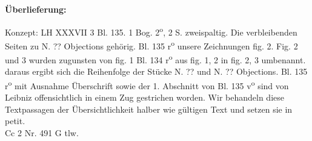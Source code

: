       
               
                \begin{ledgroupsized}[r]{120mm}
                \footnotesize 
                \pstart                
                \noindent\textbf{\"{U}berlieferung:}   
                \pend
                \end{ledgroupsized}
            
              
                            \begin{ledgroupsized}[r]{114mm}
                            \footnotesize 
                            \pstart \parindent -6mm
                            Konzept: LH XXXVII 3 Bl. 135. 1 Bog. 2\textsuperscript{o}, 2 S. zweispaltig. Die verbleibenden Seiten zu N. ?? {Objections} geh\"{o}rig. Bl. 135 r\textsuperscript{o} unsere Zeichnungen fig. 2. Fig. 2 und 3 wurden zugunsten von fig. 1 Bl. 134 r\textsuperscript{o} aus fig. 1, 2 in fig. 2, 3 umbenannt. daraus ergibt sich die Reihenfolge der St\"{u}cke N. ?? und N. ?? {Objections}. Bl. 135 r\textsuperscript{o} mit Ausnahme \"{U}berschrift sowie der 1. Abschnitt von Bl. 135 v\textsuperscript{o} sind von Leibniz offensichtlich in einem Zug gestrichen worden. Wir behandeln diese Textpassagen der \"{U}bersichtlichkeit halber wie g\"{u}ltigen Text und setzen sie in petit.\\Cc 2 Nr. 491 G tlw. \pend
                            \end{ledgroupsized}
                \vspace*{8mm}
                \pstart 
                \normalsize
